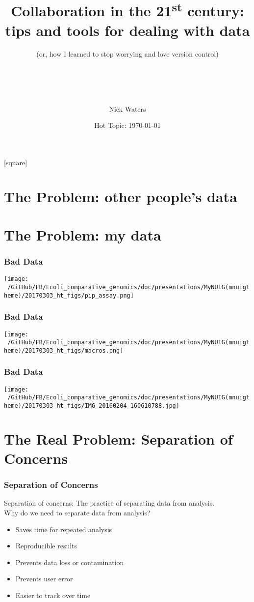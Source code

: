 \documentclass[10pt, compress]{beamer}
\title{Collaboration in the 21\textsuperscript{st} century:\\ tips and tools for dealing with data}
\subtitle{{\small (or, how I learned to stop worrying and love version control)}}
\date{\footnotesize{ Hot Topic: \today}}
\author{
\\ \\ \\ \\ \large{Nick Waters}}
\institute{
National University of Ireland, Galway\\
James Hutton Institute, Dundee}
\begin{document}
\maketitle

{}[square]
\section{The Problem: other people's data}

\section{The Problem: my data}

\begin{frame}[fragile]
  \frametitle{Bad Data}
  \texttt{[image: ~/GitHub/FB/Ecoli\_comparative\_genomics/doc/presentations/MyNUIG(mnuigtheme)/20170303\_ht\_figs/pip\_assay.png]}
\end{frame}

\begin{frame}[fragile]
  \frametitle{Bad Data}
  \texttt{[image: ~/GitHub/FB/Ecoli\_comparative\_genomics/doc/presentations/MyNUIG(mnuigtheme)/20170303\_ht\_figs/macros.png]}
\end{frame}

\begin{frame}[fragile]
  \frametitle{Bad Data}
  \texttt{[image: ~/GitHub/FB/Ecoli\_comparative\_genomics/doc/presentations/MyNUIG(mnuigtheme)/20170303\_ht\_figs/IMG\_20160204\_160610788.jpg]}
\end{frame}

\section{The Real Problem: Separation of Concerns}
\begin{frame}[fragile]
  \frametitle{Separation of Concerns}
  Separation of concerns: The practice of separating data from analysis.\\
  Why do we need to separate data from analysis?
  \begin{itemize}
  \item Saves time for repeated analysis
  \item Reproducible results
  \item Prevents data loss or contamination
  \item Prevents user error
  \item Easier to track over time
  \end{itemize}
\end{frame}
\end{document}
